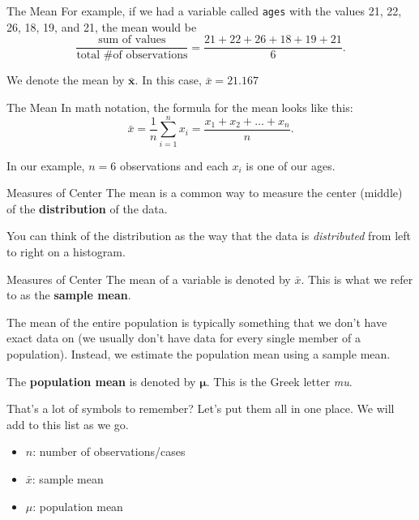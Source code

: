 \begin{frame}{The Mean}
    For example, if we had a variable called \texttt{ages} with the values 21, 22, 26, 18, 19, and 21, the mean would be
    \vspace{12pt}
    \[
    \frac{\text{sum of values}}{\text{total \# of observations}} = \frac{21+22+26+18+19+21}{6}.
    \]
    
    \vspace{12pt}
    We denote the mean by $\boldsymbol{\bar{x}}$. In this case, $\bar{x}=21.167$
\end{frame}

\begin{frame}{The Mean}
    In math notation, the formula for the mean looks like this:
    \[
        \bar{x} = \frac{1}{n}\sum_{i=1}^n x_i = \frac{x_1 + x_2 + \dots + x_n}{n}.
    \]
    
    \vspace{12pt}
    In our example, $n=6$ observations and each $x_i$ is one of our ages.
\end{frame}

\begin{frame}{Measures of Center}
    The mean is a common way to measure the center (middle) of the \textbf{distribution} of the data.
    
    \vspace{12 pt}
    You can think of the distribution as the way that the data is \textit{distributed} from left to right on a histogram.
\end{frame}

\begin{frame}{Measures of Center}
    The mean of a variable is denoted by $\bar{x}$. This is what we refer to as the \textbf{sample mean}. 
    
    \vspace{12pt}
    The mean of the entire population is typically something that we don't have exact data on (we usually don't have data for every single member of a population). Instead, we estimate the population mean using a sample mean.
    
    \vspace{12pt}
    The \textbf{population mean} is denoted by $\boldsymbol{\mu}$. This is the Greek letter \textit{mu}.
\end{frame}

\begin{frame}{That's a lot of symbols to remember?}
    Let's put them all in one place. We will add to this list as we go.
    \begin{itemize}
        \item $n$: number of observations/cases
        \item $\bar{x}$: sample mean
        \item $\mu$: population mean
    \end{itemize}
\end{frame}

